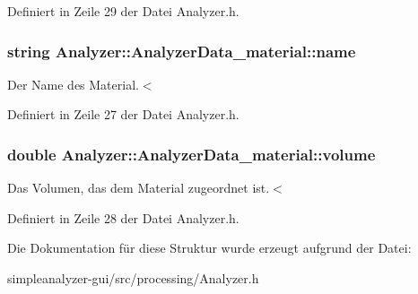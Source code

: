 Definiert in Zeile 29 der Datei Analyzer.\-h.

\hypertarget{structAnalyzer_1_1AnalyzerData__material_a0a6b01fc900ce677ae8403d3a85b829b}{
\subsubsection[{name}]{\setlength{\rightskip}{0pt plus 5cm}string Analyzer\-::\-Analyzer\-Data\-\_\-material\-::name}}\label{structAnalyzer_1_1AnalyzerData__material_a0a6b01fc900ce677ae8403d3a85b829b}
Der Name des Material.$<$ 

Definiert in Zeile 27 der Datei Analyzer.\-h.

\hypertarget{structAnalyzer_1_1AnalyzerData__material_a20017730ff899b65f91aa30caaf35dd6}{
\subsubsection[{volume}]{\setlength{\rightskip}{0pt plus 5cm}double Analyzer\-::\-Analyzer\-Data\-\_\-material\-::volume}}\label{structAnalyzer_1_1AnalyzerData__material_a20017730ff899b65f91aa30caaf35dd6}
Das Volumen, das dem Material zugeordnet ist.$<$ 

Definiert in Zeile 28 der Datei Analyzer.\-h.



Die Dokumentation für diese Struktur wurde erzeugt aufgrund der Datei\-:\begin{DoxyCompactItemize}
\item 
simpleanalyzer-\/gui/src/processing/Analyzer.\-h\end{DoxyCompactItemize}
